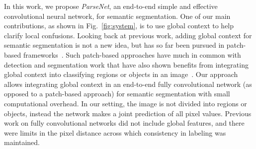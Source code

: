 \documentclass{article} %
\begin{document}
In this work, we propose \emph{ParseNet}, an end-to-end simple and effective convolutional neural network, for semantic segmentation. One of our main contributions, as shown in Fig.~\ref{fig:system}, is to use global context to help clarify local confusions. Looking back at previous work, adding global context for semantic segmentation is not a new idea, but has so far been pursued in patch-based frameworks~\cite{lucchi2011spatial}. Such patch-based approaches have much in common with detection and segmentation work that have also shown benefits from integrating global context into classifying regions or objects in an image~\cite{szegedy2014scalable, mostajabi2014feedforward}. Our approach allows integrating global context in an end-to-end fully convolutional network (as opposed to a patch-based approach) for semantic segmentation with small computational overhead. In our setting, the image is not divided into regions or objects, instead the network makes a joint prediction of all pixel values. Previous work on fully convolutional networks did not include global features, and there were limits in the pixel distance across which consistency in labeling was maintained.
\end{document}
